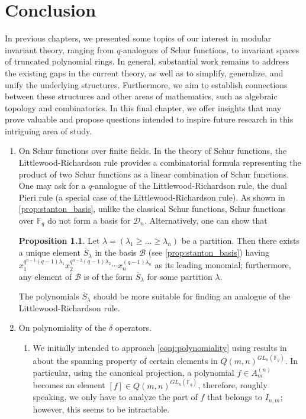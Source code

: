 \documentclass[12pt,a4paper]{report}
\theoremstyle{definition}
\newtheorem{proposition}[theorem]{Proposition}
\theoremstyle{remark}
\theoremstyle{definition}
\begin{document}
\chapter{Conclusion}\label{chap:conclusion}
In previous chapters, we presented some topics of our interest in modular invariant theory, ranging from $q$-analogues of Schur functions, to invariant spaces of truncated polynomial rings. In general, substantial work remains to address the existing gaps in the current theory, as well as to simplify, generalize, and unify the underlying structures. Furthermore, we aim to establish connections between these structures and other areas of mathematics, such as algebraic topology and combinatorics. In this final chapter, we offer insights that may prove valuable and propose questions intended to inspire future research in this intriguing area of study.
\begin{enumerate}
    \item On Schur functions over finite fields.\smallbreak
    In the theory of Schur functions, the Littlewood-Richardson rule \cite{littlewood_richardson} provides a combinatorial formula representing the product of two Schur functions as a linear combination of Schur functions. One may ask for a $q$-analogue of the Littlewood-Richardson rule, the dual Pieri rule (a special case of the Littlewood-Richardson rule).
    As shown in \cref{prop:stanton_basis}, unlike the classical Schur functions, Schur functions over $\mathbb{F}_q$ do not form a basis for $\mathcal{D}_n$. Alternatively, one can show that
    \begin{proposition}\label{prop:proper_definition_of_schur}
        Let $\lambda = (\lambda_1\geq  \ldots\geq \lambda_n)$ be a partition. Then there exists a unique element $\overline{S}_{\lambda}$ in the basis $\mathcal{B}$ (see \cref{prop:stanton_basis}) having $x_1^{q^{n-1}(q-1)\lambda_1}x_2^{q^{n-2}(q-1)\lambda_2}\cdots x_n^{(q-1)\lambda_n}$ as its leading monomial; furthermore, any element of $\mathcal{B}$ is of the form $\overline{S}_{\lambda}$ for some partition $\lambda$. 
    \end{proposition}
    The polynomials $\overline{S}_{\lambda}$ should be more suitable for finding an analogue of the Littlewood-Richardson rule.
    \item On polynomiality of the $\delta$ operators.\smallbreak
    \begin{enumerate}
        \item We initially intended to approach \cref{conj:polynomiality} using results in \cite{ha_hai_nghia_GL} about the spanning property of certain elements in $Q(m, n)^{GL_n(\mathbb{F}_q)}$. In particular, using the canonical projection, a polynomial $f\in A_{m}^{(n)}$ becomes an element $[f]\in Q(m, n)^{GL_n(\mathbb{F}_q)}$, therefore, roughly speaking, we only have to analyze the part of $f$ that belongs to $I_{n, m}$; however, this seems to be intractable.

\end{enumerate}
\end{enumerate}
\end{document}
